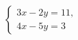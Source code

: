 \begin{ex}
	\begin{condition}
		\( \left\{
		\begin{array}{l}
			3x-2y=11,\\
			4x-5y=3
		\end{array}
		\right. \)
	\end{condition}
\end{ex}